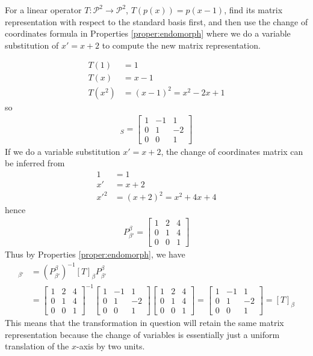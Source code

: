 \begin{Exercise}
For a linear operator $T: \mathcal{P}^2 \to \mathcal{P}^2$, $T(p(x)) = p(x-1)$, find its matrix representation with respect to the standard basis first, and then use the change of coordinates formula in Properties \ref{proper:endomorph} where we do a variable substitution of $x' = x+2$ to compute the new matrix representation.
\end{Exercise}
\begin{Answer}
\begin{align*}
T(1) &= 1 \\
T(x) &= x-1 \\
T(x^2) &= (x-1)^2 = x^2 - 2x + 1
\end{align*}
so
\begin{align*}
[T]_S =
\begin{bmatrix}
1 & -1 & 1\\
0 & 1 & -2 \\
0 & 0 & 1
\end{bmatrix}
\end{align*}
If we do a variable substitution $x' = x+2$, the change of coordinates matrix can be inferred from
\begin{align*}
1 &= 1 \\
x' &= x+2 \\
x'^2 &= (x+2)^2 = x^2 + 4x + 4 
\end{align*}
hence
\begin{align*}
P_{\beta'}^{\beta} = 
\begin{bmatrix}
1 & 2 & 4 \\
0 & 1 & 4 \\
0 & 0 & 1
\end{bmatrix}
\end{align*}
Thus by Properties \ref{proper:endomorph}, we have
\begin{align*}
[T]_{\beta'} &= (P_{\beta'}^\beta)^{-1} [T]_\beta P_{\beta'}^\beta \\
&=
\begin{bmatrix}
1 & 2 & 4 \\
0 & 1 & 4 \\
0 & 0 & 1
\end{bmatrix}^{-1}
\begin{bmatrix}
1 & -1 & 1\\
0 & 1 & -2 \\
0 & 0 & 1
\end{bmatrix}
\begin{bmatrix}
1 & 2 & 4 \\
0 & 1 & 4 \\
0 & 0 & 1
\end{bmatrix}
= \begin{bmatrix}
1 & -1 & 1\\
0 & 1 & -2 \\
0 & 0 & 1
\end{bmatrix} = [T]_\beta
\end{align*}
This means that the transformation in question will retain the same matrix representation because the change of variables is essentially just a uniform translation of the $x$-axis by two units.
\end{Answer}

